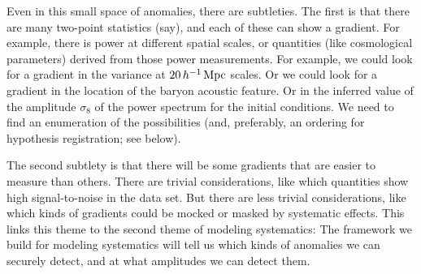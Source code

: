 \documentclass[12pt, fullpage, letterpaper]{article}
\begin{document}
Even in this small space of anomalies, there are subtleties. The first
is that there are many two-point statistics (say), and each of these can
show a gradient. For example, there is power at different spatial scales,
or quantities (like cosmological parameters) derived from those power
measurements. For example, we could look for a gradient in the variance at
$20\,h^{-1}\,{\mathrm{Mpc}}$ scales. Or we could look for a gradient in the location
of the baryon acoustic feature. Or in the inferred value of the amplitude
$\sigma_8$ of the power spectrum for the initial conditions.
We need to find an enumeration of the possibilities (and, preferably, an
ordering for hypothesis registration; see below).

The second subtlety is that there will be some gradients that are easier
to measure than others. There are trivial considerations, like which
quantities show high signal-to-noise in the data set. But there are less
trivial considerations, like which kinds of gradients could be mocked or
masked by systematic effects.
This links this theme to the second theme of modeling systematics:
The framework we build for modeling systematics will tell us which
kinds of anomalies we can securely detect, and at what amplitudes we
can detect them.
\end{document}
